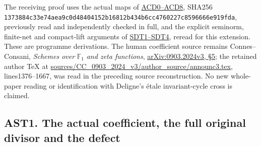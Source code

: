 The receiving proof uses the actual maps of
\href{https://github.com/KokunoYumeto/zeta-function-research-reader/blob/36a82ecca98addb8a98b48204e349737856c7223/workbenches/splitzero-tandem/continuations/20260924-cohomology-weight-and-character-lifts/gct-weight-control/proofs/CC_ADJOINT_DEFECT_CONTINUOUS_DUAL.md}{ACD0--ACD8},
SHA256
\texttt{1373884c33e74aea9c0d48404152b16812b434b6cc4760227c8596666e919fda},
previously read and independently checked in full, and the explicit
seminorm, finite-net and compact-lift arguments of
\href{https://github.com/KokunoYumeto/zeta-function-research-reader/blob/36a82ecca98addb8a98b48204e349737856c7223/workbenches/splitzero-tandem/continuations/20260924-cohomology-weight-and-character-lifts/gct-weight-control/proofs/CC_STRONG_DUAL_TOPOLOGY_AND_JETS.md}{SDT1--SDT4},
reread for this extension. These are programme derivations. The human
coefficient source remains Connes--Consani, \emph{Schemes over}
\(\mathbb F_1\) \emph{and zeta functions},
\href{https://arxiv.org/abs/0903.2024v3}{arXiv:0903.2024v3, §5}; the
retained author TeX at
\href{https://arxiv.org/abs/0903.2024v3}{sources/CC\_0903\_2024\_v3/author\_source/announc3.tex},
lines1376--1667, was read in the preceding source reconstruction. No new
whole-paper reading or identification with Deligne's étale
invariant-cycle cross is claimed.

\subsection{AST1. The actual coefficient, the full original divisor and
the
defect}\label{ast1.-the-actual-coefficient-the-full-original-divisor-and-the-defect}

